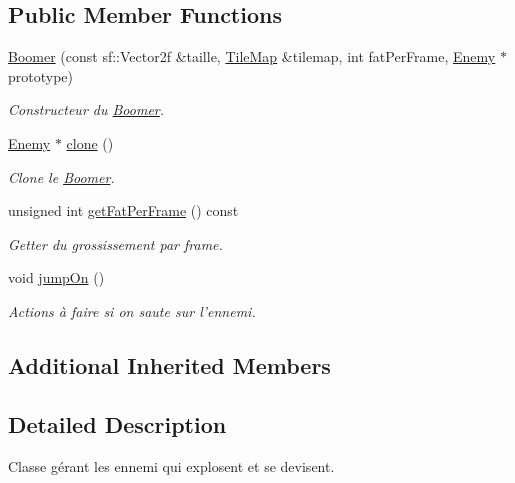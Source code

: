 \subsection*{Public Member Functions}
\begin{DoxyCompactItemize}
\item 
\hyperlink{class_boomer_a45e535e25b46f8ae440a929bf7c2dddd}{Boomer} (const sf\+::\+Vector2f \&taille, \hyperlink{class_tile_map}{Tile\+Map} \&tilemap, int fat\+Per\+Frame, \hyperlink{class_enemy}{Enemy} $\ast$prototype)
\begin{DoxyCompactList}\small\item\em Constructeur du \hyperlink{class_boomer}{Boomer}. \end{DoxyCompactList}\item 
\hyperlink{class_enemy}{Enemy} $\ast$ \hyperlink{class_boomer_a757fb2c73fad3ab04086b9bbb15208b0}{clone} ()
\begin{DoxyCompactList}\small\item\em Clone le \hyperlink{class_boomer}{Boomer}. \end{DoxyCompactList}\item 
unsigned int \hyperlink{class_boomer_a8fa91ac287ca7f7cfd9f1cf1ce154870}{get\+Fat\+Per\+Frame} () const 
\begin{DoxyCompactList}\small\item\em Getter du grossissement par frame. \end{DoxyCompactList}\item 
void \hyperlink{class_boomer_a30a5e9732c86abc616a6d31badbb2ce8}{jump\+On} ()
\begin{DoxyCompactList}\small\item\em Actions à faire si on saute sur l'ennemi. \end{DoxyCompactList}\end{DoxyCompactItemize}
\subsection*{Additional Inherited Members}


\subsection{Detailed Description}
Classe gérant les ennemi qui explosent et se devisent. 

